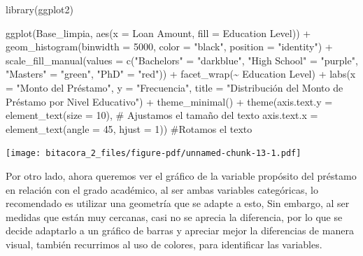 \documentclass[
  letterpaper,
  DIV=11,
  numbers=noendperiod]{scrreprt}
\newenvironment{Shaded}{\begin{snugshade}}{\end{snugshade}}
\newcommand{\AttributeTok}[1]{\textcolor[rgb]{0.40,0.45,0.13}{#1}}
\newcommand{\CommentTok}[1]{\textcolor[rgb]{0.37,0.37,0.37}{#1}}
\newcommand{\DecValTok}[1]{\textcolor[rgb]{0.68,0.00,0.00}{#1}}
\newcommand{\FunctionTok}[1]{\textcolor[rgb]{0.28,0.35,0.67}{#1}}
\newcommand{\NormalTok}[1]{\textcolor[rgb]{0.00,0.23,0.31}{#1}}
\newcommand{\OtherTok}[1]{\textcolor[rgb]{0.00,0.23,0.31}{#1}}
\newcommand{\SpecialCharTok}[1]{\textcolor[rgb]{0.37,0.37,0.37}{#1}}
\newcommand{\StringTok}[1]{\textcolor[rgb]{0.13,0.47,0.30}{#1}}
\begin{document}
\begin{Shaded}
\begin{Highlighting}[]
\FunctionTok{library}\NormalTok{(ggplot2)}

\FunctionTok{ggplot}\NormalTok{(Base\_limpia, }\FunctionTok{aes}\NormalTok{(}\AttributeTok{x =} \StringTok{\textasciigrave{}}\AttributeTok{Loan Amount}\StringTok{\textasciigrave{}}\NormalTok{, }\AttributeTok{fill =} \StringTok{\textasciigrave{}}\AttributeTok{Education Level}\StringTok{\textasciigrave{}}\NormalTok{)) }\SpecialCharTok{+}  
  \FunctionTok{geom\_histogram}\NormalTok{(}\AttributeTok{binwidth =} \DecValTok{5000}\NormalTok{, }\AttributeTok{color =} \StringTok{"black"}\NormalTok{, }\AttributeTok{position =} \StringTok{"identity"}\NormalTok{) }\SpecialCharTok{+}  
  \FunctionTok{scale\_fill\_manual}\NormalTok{(}\AttributeTok{values =} \FunctionTok{c}\NormalTok{(}\StringTok{"Bachelor\textquotesingle{}s"} \OtherTok{=} \StringTok{"darkblue"}\NormalTok{, }\StringTok{"High School"} \OtherTok{=} \StringTok{"purple"}\NormalTok{, }\StringTok{"Master\textquotesingle{}s"} \OtherTok{=} \StringTok{"green"}\NormalTok{, }\StringTok{"PhD"} \OtherTok{=} \StringTok{"red"}\NormalTok{)) }\SpecialCharTok{+}  
  \FunctionTok{facet\_wrap}\NormalTok{(}\SpecialCharTok{\textasciitilde{}} \StringTok{\textasciigrave{}}\AttributeTok{Education Level}\StringTok{\textasciigrave{}}\NormalTok{) }\SpecialCharTok{+}  
  \FunctionTok{labs}\NormalTok{(}\AttributeTok{x =} \StringTok{"Monto del Préstamo"}\NormalTok{, }\AttributeTok{y =} \StringTok{"Frecuencia"}\NormalTok{, }\AttributeTok{title =} \StringTok{"Distribución del Monto de Préstamo por Nivel Educativo"}\NormalTok{) }\SpecialCharTok{+} 
  \FunctionTok{theme\_minimal}\NormalTok{() }\SpecialCharTok{+}
  \FunctionTok{theme}\NormalTok{(}\AttributeTok{axis.text.y =} \FunctionTok{element\_text}\NormalTok{(}\AttributeTok{size =} \DecValTok{10}\NormalTok{), }\CommentTok{\# Ajustamos el tamaño del texto}
        \AttributeTok{axis.text.x =} \FunctionTok{element\_text}\NormalTok{(}\AttributeTok{angle =} \DecValTok{45}\NormalTok{, }\AttributeTok{hjust =} \DecValTok{1}\NormalTok{))  }\CommentTok{\#Rotamos el texto}
\end{Highlighting}
\end{Shaded}

\texttt{[image: bitacora\_2\_files/figure-pdf/unnamed-chunk-13-1.pdf]}

Por otro lado, ahora queremos ver el gráfico de la variable propósito
del préstamo en relación con el grado académico, al ser ambas variables
categóricas, lo recomendado es utilizar una geometría que se adapte a
esto, Sin embargo, al ser medidas que están muy cercanas, casi no se
aprecia la diferencia, por lo que se decide adaptarlo a un gráfico de
barras y apreciar mejor la diferencias de manera visual, también
recurrimos al uso de colores, para identificar las variables.
\end{document}
